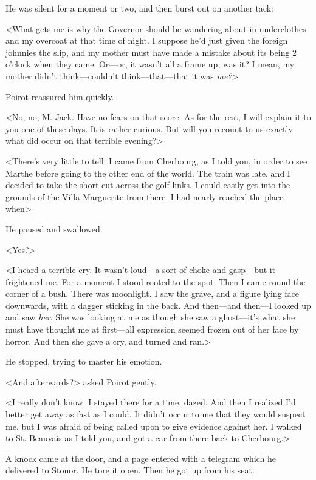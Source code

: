  He was silent for a moment or two, and then burst out on another tack: 

 <What gets me is why the Governor should be wandering about in underclothes and my overcoat at that time of night. I suppose he'd just given the foreign johnnies the slip, and my mother must have made a mistake about its being 2 o'clock when they came. Or—or, it wasn't all a frame up, was it? I mean, my mother didn't think—couldn't think—that—that it was \emph{me?}> 

 Poirot reassured him quickly. 

 <No, no, M. Jack. Have no fears on that score. As for the rest, I will explain it to you one of these days. It is rather curious. But will you recount to us exactly what did occur on that terrible evening?> 

 <There's very little to tell. I came from Cherbourg, as I told you, in order to see Marthe before going to the other end of the world. The train was late, and I decided to take the short cut across the golf links. I could easily get into the grounds of the Villa Marguerite from there. I had nearly reached the place when\longdash> 

 He paused and swallowed. 

 <Yes?> 

 <I heard a terrible cry. It wasn't loud—a sort of choke and gasp—but it frightened me. For a moment I stood rooted to the spot. Then I came round the corner of a bush. There was moonlight. I saw the grave, and a figure lying face downwards, with a dagger sticking in the back. And then—and then—I looked up and saw \emph{her}. She was looking at me as though she saw a ghost—it's what she must have thought me at first—all expression seemed frozen out of her face by horror. And then she gave a cry, and turned and ran.> 

 He stopped, trying to master his emotion. 

 <And afterwards?> asked Poirot gently. 

 <I really don't know. I stayed there for a time, dazed. And then I realized I'd better get away as fast as I could. It didn't occur to me that they would suspect me, but I was afraid of being called upon to give evidence against her. I walked to St. Beauvais as I told you, and got a car from there back to Cherbourg.> 

 A knock came at the door, and a page entered with a telegram which he delivered to Stonor. He tore it open. Then he got up from his seat. 

